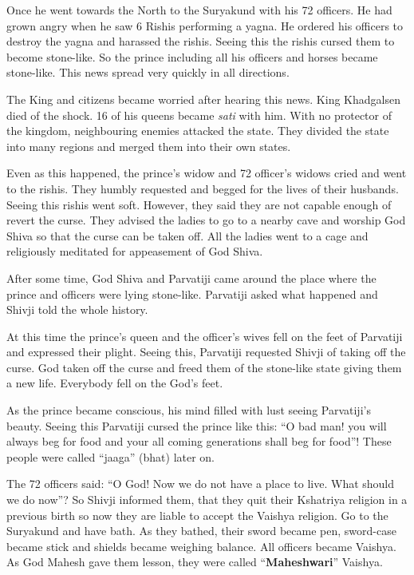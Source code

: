 Once he went towards the North to the Suryakund with his 72 officers. He had grown angry when he saw 6 Rishis performing a yagna. He ordered his officers to destroy the yagna and harassed the rishis. Seeing this the rishis cursed them to become stone-like. So the prince including all his officers and horses became stone-like. This news spread very quickly in all directions.

The King and citizens became worried after hearing this news. King Khadgalsen died of the shock. 16 of his queens became \textit{sati} with him. With no protector of the kingdom, neighbouring enemies attacked the state. They divided the state into many regions and merged them into their own states.

Even as this happened, the prince's widow and 72 officer's widows cried and went to the rishis. They humbly requested and begged for the lives of their husbands. Seeing this rishis went soft. However, they said they are not capable enough of revert the curse. They advised the ladies to go to a nearby cave and worship God Shiva so that the curse can be taken off. All the ladies went to a cage and religiously meditated for appeasement of God Shiva.

After some time, God Shiva and Parvatiji came around the place where the prince and officers were lying stone-like. Parvatiji asked what happened and Shivji told the whole history.

At this time the prince's queen and the officer's wives fell on the feet of Parvatiji and expressed their plight. Seeing this, Parvatiji requested Shivji of taking off the curse. God taken off the curse and freed them of the stone-like state giving them a new life. Everybody fell on the God's feet.

As the prince became conscious, his mind filled with lust seeing Parvatiji's beauty. Seeing this Parvatiji cursed the prince like this: ``O bad man! you will always beg for food and your all coming generations shall beg for food''! These people were called ``jaaga'' (bhat) later on.

The 72 officers said: ``O God! Now we do not have a place to live. What should we do now''? So Shivji informed them, that they quit their Kshatriya religion in a previous birth so now they are liable to accept the Vaishya religion. Go to the Suryakund and have bath. As they bathed, their sword became pen, sword-case became stick and shields became weighing balance. All officers became Vaishya. As God Mahesh gave them lesson, they were called ``\textbf{Maheshwari}'' Vaishya.

